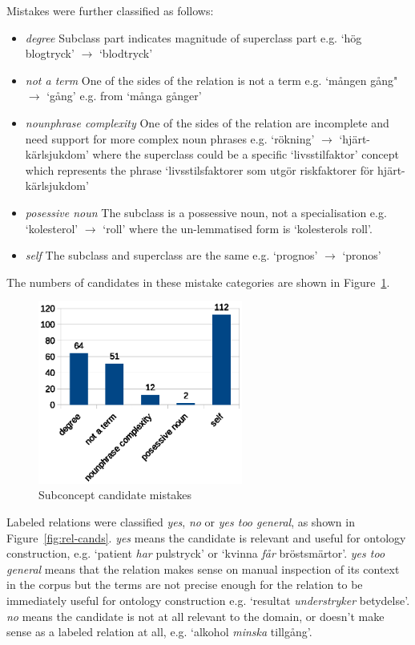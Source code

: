 \documentclass[a4paper]{report}
\begin{document}
Mistakes were further classified as follows:

\begin{itemize}
  \item \emph{degree} Subclass part indicates magnitude of superclass part e.g. `hög blogtryck' \(\rightarrow\) `blodtryck'
  \item \emph{not a term} One of the sides of the relation is not a term e.g. `mången gång" \(\rightarrow\) `gång' e.g. from `många gånger'
  \item \emph{nounphrase complexity} One of the sides of the relation are incomplete and need support for more complex noun phrases e.g. `rökning' \(\rightarrow\) `hjärt-kärlsjukdom' where the superclass could be a specific `livsstilfaktor' concept which represents the phrase `livsstilsfaktorer som utgör riskfaktorer för hjärt-kärlsjukdom'
  \item \emph{posessive noun} The subclass is a possessive noun, not a specialisation e.g. `kolesterol' \(\rightarrow\) `roll' where the un-lemmatised form is `kolesterols roll'.
  \item \emph{self} The subclass and superclass are the same e.g. `prognos' \(\rightarrow\) `pronos'
\end{itemize}

The numbers of candidates in these mistake categories are shown in Figure~\ref{fig:subconcept-cands}.

\begin{figure}
  \centering
  \includegraphics[width=0.6\textwidth]{graphics/subconcepts-mistakes.eps}
  \caption{Subconcept candidate mistakes}
  \label{fig:subconcept-cands}
\end{figure}

Labeled relations were classified \emph{yes}, \emph{no} or \emph{yes too general}, as shown in Figure~\ref{fig:rel-cands}.
\emph{yes} means the candidate is relevant and useful for ontology construction, e.g. `patient \emph{har} pulstryck' or `kvinna \emph{får} bröstsmärtor'.
\emph{yes too general} means that the relation makes sense on manual inspection of its context in the corpus but the terms are not precise enough for the relation to be immediately useful for ontology construction e.g. `resultat \emph{understryker} betydelse'.
\emph{no} means the candidate is not at all relevant to the domain, or doesn't make sense as a labeled relation at all, e.g. `alkohol \emph{minska} tillgång'.
\end{document}
